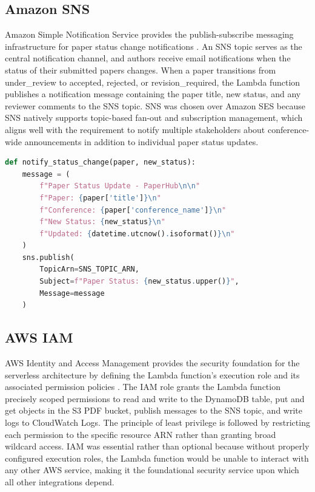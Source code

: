 \documentclass[conference]{IEEEtran}
\begin{document}
\subsection{Amazon SNS}

Amazon Simple Notification Service provides the publish-subscribe messaging infrastructure for paper status change notifications \cite{awssns}. An SNS topic serves as the central notification channel, and authors receive email notifications when the status of their submitted papers changes. When a paper transitions from under\_review to accepted, rejected, or revision\_required, the Lambda function publishes a notification message containing the paper title, new status, and any reviewer comments to the SNS topic. SNS was chosen over Amazon SES because SNS natively supports topic-based fan-out and subscription management, which aligns well with the requirement to notify multiple stakeholders about conference-wide announcements in addition to individual paper status updates.

\begin{lstlisting}[language=Python, caption={SNS notification on paper status change}]
def notify_status_change(paper, new_status):
    message = (
        f"Paper Status Update - PaperHub\n\n"
        f"Paper: {paper['title']}\n"
        f"Conference: {paper['conference_name']}\n"
        f"New Status: {new_status}\n"
        f"Updated: {datetime.utcnow().isoformat()}\n"
    )
    sns.publish(
        TopicArn=SNS_TOPIC_ARN,
        Subject=f"Paper Status: {new_status.upper()}",
        Message=message
    )
\end{lstlisting}

\subsection{AWS IAM}

AWS Identity and Access Management provides the security foundation for the serverless architecture by defining the Lambda function's execution role and its associated permission policies \cite{awsiam}. The IAM role grants the Lambda function precisely scoped permissions to read and write to the DynamoDB table, put and get objects in the S3 PDF bucket, publish messages to the SNS topic, and write logs to CloudWatch Logs. The principle of least privilege is followed by restricting each permission to the specific resource ARN rather than granting broad wildcard access. IAM was essential rather than optional because without properly configured execution roles, the Lambda function would be unable to interact with any other AWS service, making it the foundational security service upon which all other integrations depend.
\end{document}
